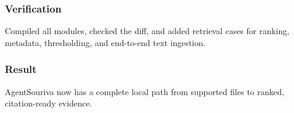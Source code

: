 \subsubsection{Verification}

Compiled all modules, checked the diff, and added retrieval cases for ranking, metadata, thresholding, and end-to-end text ingestion.

\subsubsection{Result}

AgentSouriva now has a complete local path from supported files to ranked, citation-ready evidence.

